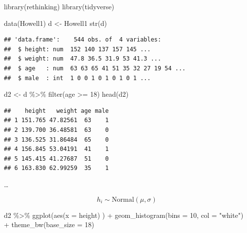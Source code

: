 \documentclass[
  a4paper,11pt,twoside,onecolumn,openright,final,oldfontcommands]{memoir}
\newenvironment{Shaded}{\begin{snugshade}}{\end{snugshade}}
\newcommand{\AttributeTok}[1]{\textcolor[rgb]{0.77,0.63,0.00}{#1}}
\newcommand{\DecValTok}[1]{\textcolor[rgb]{0.00,0.00,0.81}{#1}}
\newcommand{\FunctionTok}[1]{\textcolor[rgb]{0.00,0.00,0.00}{#1}}
\newcommand{\NormalTok}[1]{#1}
\newcommand{\OtherTok}[1]{\textcolor[rgb]{0.56,0.35,0.01}{#1}}
\newcommand{\SpecialCharTok}[1]{\textcolor[rgb]{0.00,0.00,0.00}{#1}}
\newcommand{\StringTok}[1]{\textcolor[rgb]{0.31,0.60,0.02}{#1}}
\theoremstyle{definition}
\theoremstyle{definition}
\theoremstyle{definition}
\theoremstyle{definition}
\theoremstyle{remark}
\begin{document}
\begin{Shaded}
\begin{Highlighting}[]
\FunctionTok{library}\NormalTok{(rethinking)}
\FunctionTok{library}\NormalTok{(tidyverse)}

\FunctionTok{data}\NormalTok{(Howell1)}
\NormalTok{d }\OtherTok{\textless{}{-}}\NormalTok{ Howell1}
\FunctionTok{str}\NormalTok{(d)}
\end{Highlighting}
\end{Shaded}

\begin{verbatim}
## 'data.frame':    544 obs. of  4 variables:
##  $ height: num  152 140 137 157 145 ...
##  $ weight: num  47.8 36.5 31.9 53 41.3 ...
##  $ age   : num  63 63 65 41 51 35 32 27 19 54 ...
##  $ male  : int  1 0 0 1 0 1 0 1 0 1 ...
\end{verbatim}

\begin{Shaded}
\begin{Highlighting}[]
\NormalTok{d2 }\OtherTok{\textless{}{-}}\NormalTok{ d }\SpecialCharTok{\%\textgreater{}\%} \FunctionTok{filter}\NormalTok{(age }\SpecialCharTok{\textgreater{}=} \DecValTok{18}\NormalTok{)}
\FunctionTok{head}\NormalTok{(d2)}
\end{Highlighting}
\end{Shaded}

\begin{verbatim}
##    height   weight age male
## 1 151.765 47.82561  63    1
## 2 139.700 36.48581  63    0
## 3 136.525 31.86484  65    0
## 4 156.845 53.04191  41    1
## 5 145.415 41.27687  51    0
## 6 163.830 62.99259  35    1
\end{verbatim}

\ldots{}

\[h_{i} \sim \mathrm{Normal}(\mu, \sigma)\]

\begin{Shaded}
\begin{Highlighting}[]
\NormalTok{d2 }\SpecialCharTok{\%\textgreater{}\%}
    \FunctionTok{ggplot}\NormalTok{(}\FunctionTok{aes}\NormalTok{(}\AttributeTok{x =}\NormalTok{ height) ) }\SpecialCharTok{+}
    \FunctionTok{geom\_histogram}\NormalTok{(}\AttributeTok{bins =} \DecValTok{10}\NormalTok{, }\AttributeTok{col =} \StringTok{"white"}\NormalTok{) }\SpecialCharTok{+}
    \FunctionTok{theme\_bw}\NormalTok{(}\AttributeTok{base\_size =} \DecValTok{18}\NormalTok{)}
\end{Highlighting}
\end{Shaded}
\end{document}
